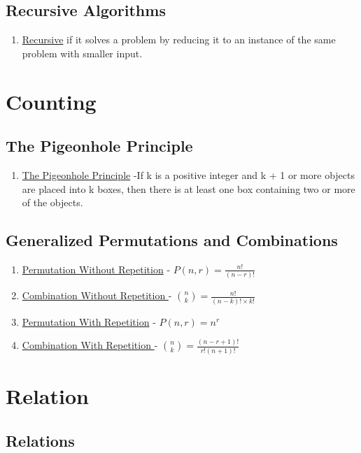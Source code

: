 \documentclass[12pt]{article}
\begin{document}
\subsection{Recursive Algorithms}
\begin{enumerate}
\item \underline{Recursive} if it solves a problem by reducing it to an instance of the same problem with smaller input.
\end{enumerate}



\section{Counting}
\subsection{The Pigeonhole Principle}
\begin{enumerate}
\item \underline{The Pigeonhole Principle} -If k is a positive integer and k + 1 or more objects are placed into k boxes, then there is at least one box containing two or more of the objects.
\end{enumerate}

\subsection{Generalized Permutations and Combinations}

\begin{enumerate}
\item \underline{Permutation Without Repetition} - $P( n, r ) = \frac{n!}{(n-r)!}$
\item \underline{Combination Without Repetition } - ${ n \choose k } = \frac{n!}{(n - k)! \times k!}$
\item \underline{Permutation With Repetition} - $P( n, r ) = n^{r}$
\item \underline{Combination With Repetition } - ${ n \choose k } = \frac{(n -r + 1)!}{r!(n + 1)!}$
\end{enumerate}

\section{Relation}
\subsection{Relations}
\end{document}
